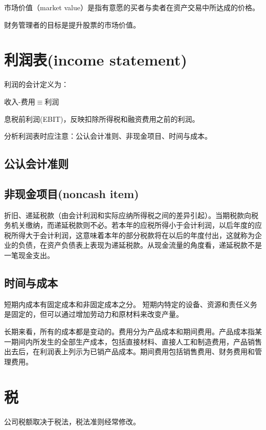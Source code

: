 \documentclass{article}
\begin{document}
\hspace*{\fill}

市场价值（market value）是指有意愿的买者与卖者在资产交易中所达成的价格。

\hspace*{\fill}

财务管理者的目标是提升股票的市场价值。

\section{利润表(income statement)}
利润的会计定义为：

收入-费用$ \equiv $利润

\hspace*{\fill}

息税前利润(EBIT)，反映扣除所得税和融资费用之前的利润。

\hspace*{\fill}

分析利润表时应注意：公认会计准则、非现金项目、时间与成本。

\subsection{公认会计准则}

\subsection{非现金项目(noncash item)}
折旧、递延税款（由会计利润和实际应纳所得税之间的差异引起）。当期税款向税务机关缴纳，而递延税款则不必。若本年的应税所得小于会计利润，以后年度的应税所得大于会计利润，这意味着本年的部分税款将在以后的年度付出，这就称为企业的负债，在资产负债表上表现为递延税款。从现金流量的角度看，递延税款不是一笔现金支出。

\subsection{时间与成本}
短期内成本有固定成本和非固定成本之分。
短期内特定的设备、资源和责任义务是固定的，但可以通过增加劳动力和原材料来改变产量。


长期来看，所有的成本都是变动的。费用分为产品成本和期间费用。产品成本指某一期间内所发生的全部生产成本，包括直接材料、直接人工和制造费用，产品销售出去后，在利润表上列示为已销产品成本。期间费用包括销售费用、财务费用和管理费用。

\section{税}
公司税额取决于税法，税法准则经常修改。
\end{document}
